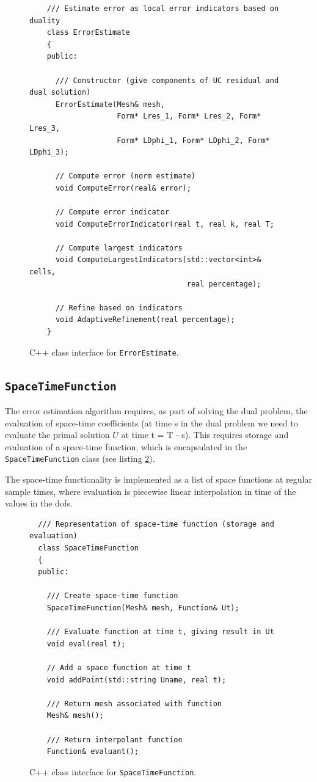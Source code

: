 \begin{figure}[!h]
{\small
\begin{lstlisting}
    /// Estimate error as local error indicators based on duality
    class ErrorEstimate
    {
    public:

      /// Constructor (give components of UC residual and dual solution)
      ErrorEstimate(Mesh& mesh,
                    Form* Lres_1, Form* Lres_2, Form* Lres_3,
                    Form* LDphi_1, Form* LDphi_2, Form* LDphi_3);

      // Compute error (norm estimate)
      void ComputeError(real& error);

      // Compute error indicator
      void ComputeErrorIndicator(real t, real k, real T;

      // Compute largest indicators
      void ComputeLargestIndicators(std::vector<int>& cells,
                                    real percentage);

      // Refine based on indicators
      void AdaptiveRefinement(real percentage);
    }
\end{lstlisting}
}
\caption{
C++ class interface for {\tt ErrorEstimate}.
}
\label{code:ErrorEstimate}
\end{figure}

\subsection{\tt SpaceTimeFunction}

The error estimation algorithm requires, as part of solving the dual
problem, the evaluation of space-time coefficients (at time s in the
dual problem we need to evaluate the primal solution $U$ at time t = T
- s). This requires storage and evaluation of a space-time function,
which is encapsulated in the {\tt SpaceTimeFunction} class (see
listing \ref{code:SpaceTimeFunction}).

The space-time functionality is implemented as a list of space
functions at regular sample times, where evaluation is piecewise
linear interpolation in time of the values in the dofs.


\begin{figure}[!h]
{\small
\begin{lstlisting}
  /// Representation of space-time function (storage and evaluation)
  class SpaceTimeFunction
  {
  public:

    /// Create space-time function
    SpaceTimeFunction(Mesh& mesh, Function& Ut);

    /// Evaluate function at time t, giving result in Ut
    void eval(real t);

    // Add a space function at time t
    void addPoint(std::string Uname, real t);

    /// Return mesh associated with function
    Mesh& mesh();

    /// Return interpolant function
    Function& evaluant();
\end{lstlisting}
}
\caption{
C++ class interface for {\tt SpaceTimeFunction}.
}
\label{code:SpaceTimeFunction}
\end{figure}



